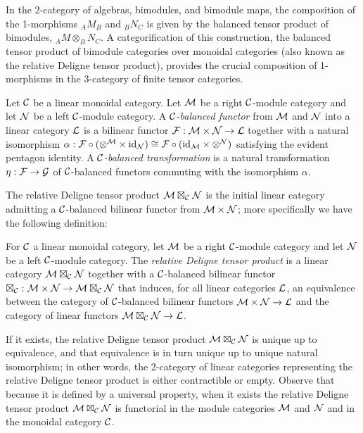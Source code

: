 \documentclass{amsart}
\begin{document}
In the 2-category of algebras, bimodules, and bimodule maps, the composition of the 1-morphisms $_A M_B$ and $_B N_C$ is given by the balanced tensor product of bimodules, $_A M \otimes_B N_C$.  A categorification of this construction, the balanced tensor product of bimodule categories over monoidal categories (also known as the relative Deligne tensor product), provides the crucial composition of 1-morphisms in the 3-category of finite tensor categories.

\begin{definition}
	Let $\mathcal C$ be a linear monoidal category. 
	Let $\mathcal M$ be a right $\mathcal C$-module category and let $\mathcal N$ be a left $\mathcal C$-module category. A {\em $\mathcal C$-balanced functor} from $\mathcal M$ and $\mathcal N$ into a linear category $\mathcal L$ is a bilinear functor $\mathcal F: \mathcal M \times \mathcal N \to \mathcal L$ together with a natural isomorphism $\alpha: \mathcal F \circ (\otimes^{\mathcal M} \times \mathrm{id}_{\mathcal N}) \cong \mathcal F \circ (\mathrm{id}_{\mathcal M} \times \otimes^{\mathcal N})$ satisfying the evident pentagon identity. A {\em $\mathcal C$-balanced transformation} is a natural transformation $\eta:\mathcal F \to \mathcal G$ of $\mathcal C$-balanced functors commuting with the isomorphism $\alpha$.
\end{definition}

The relative Deligne tensor product $\mathcal M \boxtimes_\mathcal C \mathcal N$ is the initial linear category admitting a $\mathcal C$-balanced bilinear functor from $\mathcal M \times \mathcal N$; more specifically we have the following definition:

\begin{definition}
	For $\mathcal C$ a linear monoidal category, let $\mathcal M$ be a right $\mathcal C$-module category and let $\mathcal N$ be a left $\mathcal C$-module category.  The {\em relative Deligne tensor product} is a linear category $\mathcal M \boxtimes_{\mathcal C} \mathcal N$ together with a $\mathcal C$-balanced bilinear functor $\boxtimes_{\mathcal C}: \mathcal M \times \mathcal N \to \mathcal M \boxtimes_{\mathcal C} \mathcal N$ that induces, for all linear categories $\mathcal L$, an equivalence between the category of $\mathcal C$-balanced bilinear functors $\mathcal M \times \mathcal N \to \mathcal L$ and the category of linear functors $\mathcal M \boxtimes_{\mathcal C} \mathcal N \to \mathcal L$. 
\end{definition}

\nid If it exists, the relative Deligne tensor product $\mathcal M \boxtimes_\mathcal C \mathcal N$ is unique up to equivalence, and that equivalence is in turn unique up to unique natural isomorphism; in other words, the 2-category of linear categories representing the relative Deligne tensor product is either contractible or empty.  Observe that because it is defined by a universal property, when it exists the relative Deligne tensor product $\mathcal M \boxtimes_\mathcal C \mathcal N$ is functorial in the module categories $\mathcal M$ and $\mathcal N$ and in the monoidal category $\mathcal C$. %
\end{document}
